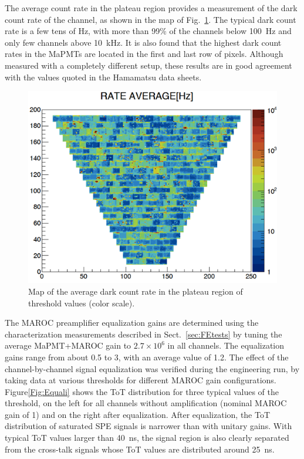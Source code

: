 \documentclass[5p,times,twocolumn]{elsarticle}
\begin{document}
The average count rate in the plateau region provides a measurement of the dark count rate of the channel, as shown
in the map of Fig.~\ref{fig:DarkCountMap}. The typical dark count rate is a few tens of Hz, with more than 99\% of
the channels below 100~Hz and only few channels above 10~kHz. It is also found that the highest dark count rates in
the MaPMTs are located in the first and last row of pixels. Although measured with a completely different setup,
these results are in good agreement with the values quoted in the Hamamatsu data sheets.

\begin{figure}[t]
\begin{center}
\includegraphics[width=1.0\columnwidth]{DarkCountMap.png}
\end{center}
\caption{Map of the average dark count rate in the plateau region of threshold values (color scale).}
\label{fig:DarkCountMap}
\end{figure}

The MAROC preamplifier equalization gains are determined using the characterization measurements described in
Sect.~\ref{sec:FEtests} by tuning the average MaPMT+MAROC gain to $2.7 \times 10^6$ in all channels. The
equalization gains range from about 0.5 to 3, with an average value of 1.2. The effect of the channel-by-channel signal
equalization was verified during the engineering run, by taking data at various thresholds for different MAROC gain
configurations.  Figure\ref{Fig:Equali} shows the ToT distribution for three typical values of the threshold, on the left
for all channels without amplification (nominal MAROC gain of 1) and on the right after equalization. After equalization,
the ToT distribution of saturated SPE signals is narrower than with unitary gains.  With typical ToT values larger than
40~ns, the signal region is also clearly separated from the cross-talk signals whose ToT values are distributed around
25~ns.
\end{document}
